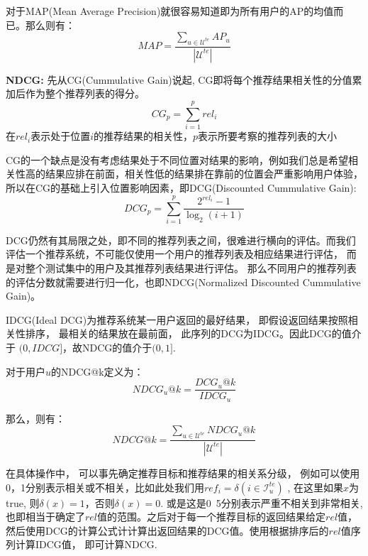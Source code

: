 对于MAP(Mean Average Precision)就很容易知道即为所有用户的AP的均值而已。那么则有：
\begin{equation*}
MAP = \frac{\sum_{u \in \mathcal{U}^{te}}AP_u}{|\mathcal{U}^{te}|}
\end{equation*}


\textbf{NDCG:}
先从CG(Cummulative Gain)说起,  CG即将每个推荐结果相关性的分值累加后作为整个推荐列表的得分。
\begin{equation*}
CG_p = \sum_{i=1}^p rel_i
\end{equation*}
在$rel_i$表示处于位置$i$的推荐结果的相关性，$p$表示所要考察的推荐列表的大小

CG的一个缺点是没有考虑结果处于不同位置对结果的影响，例如我们总是希望相关性高的结果应排在前面，相关性低的结果排在靠前的位置会严重影响用户体验， 所以在CG的基础上引入位置影响因素，即DCG(Discounted Cummulative Gain):
\begin{equation*}
DCG_p = \sum_{i=1}^p \frac{2^{rel_i}-1}{\log_2 \left(i+1\right)}
\end{equation*}

DCG仍然有其局限之处，即不同的推荐列表之间，很难进行横向的评估。而我们评估一个推荐系统，不可能仅使用一个用户的推荐列表及相应结果进行评估， 而是对整个测试集中的用户及其推荐列表结果进行评估。 那么不同用户的推荐列表的评估分数就需要进行归一化，也即NDCG(Normalized Discounted Cummulative Gain)。

IDCG(Ideal DCG)为推荐系统某一用户返回的最好结果， 即假设返回结果按照相关性排序， 最相关的结果放在最前面， 此序列的DCG为IDCG。因此DCG的值介于 $(0,IDCG]$，故NDCG的值介于$(0,1]$.

对于用户$u$的NDCG@k定义为：
\begin{equation*}
NDCG_u@k = \frac{DCG_u@k}{IDCG_u}
\end{equation*}

那么，则有：
\begin{equation*}
NDCG@k = \frac{\sum_{u\in \mathcal{U}^{te}}NDCG_u@k}{|\mathcal{U}^{te}|}
\end{equation*}

在具体操作中， 可以事先确定推荐目标和推荐结果的相关系分级， 例如可以使用 0，1分别表示相关或不相关，比如此处我们用$ref_i = \delta \left( i \in \mathcal{I}_u^{te}\right)$ , 在这里如果$x$为true, 则$\delta\left(x\right) = 1$，否则$\delta \left(x\right) = 0$. 或是这是0~5分别表示严重不相关到非常相关, 也即相当于确定了$rel$值的范围。之后对于每一个推荐目标的返回结果给定$rel$值，然后使用DCG的计算公式计计算出返回结果的DCG值。使用根据排序后的$rel$值序列计算IDCG值， 即可计算NDCG.

